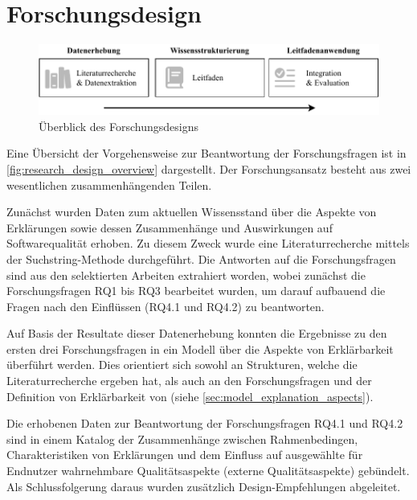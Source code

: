 \section{Forschungsdesign}
\begin{figure}[htb!]
    \begin{center}
        \includegraphics[width=\textwidth]{contents/03_research_design/res/research_design_overview.pdf}
    \end{center}
    \caption{Überblick des Forschungsdesigns}
    \label{fig:research_design_overview}
\end{figure}

Eine Übersicht der Vorgehensweise zur Beantwortung der Forschungsfragen ist in \autoref{fig:research_design_overview} dargestellt. Der Forschungsansatz besteht aus zwei wesentlichen zusammenhängenden Teilen.

Zunächst wurden Daten zum aktuellen Wissensstand über die Aspekte von Erklärungen sowie dessen Zusammenhänge und Auswirkungen auf Softwarequalität erhoben. Zu diesem Zweck wurde eine Literaturrecherche mittels der Suchstring-Methode \cite{kitchenham2004procedures} durchgeführt. Die Antworten auf die Forschungsfragen sind aus den selektierten Arbeiten extrahiert worden, wobei zunächst die Forschungsfragen RQ1 bis RQ3 bearbeitet wurden, um darauf aufbauend die Fragen nach den Einflüssen (RQ4.1 und RQ4.2) zu beantworten.

Auf Basis der Resultate dieser Datenerhebung konnten die Ergebnisse zu den ersten drei Forschungsfragen in ein Modell über die Aspekte von Erklärbarkeit überführt werden. Dies orientiert sich sowohl an Strukturen, welche die Literaturrecherche ergeben hat, als auch an den Forschungsfragen und der Definition von Erklärbarkeit von \citeauthor{chazette_knowledge_nodate} \cite{chazette_knowledge_nodate} (siehe \autoref{sec:model_explanation_aspects}).

Die erhobenen Daten zur Beantwortung der Forschungsfragen RQ4.1 und RQ4.2 sind in einem Katalog der Zusammenhänge zwischen Rahmenbedingen, Charakteristiken von Erklärungen und dem Einfluss auf ausgewählte für Endnutzer wahrnehmbare  Qualitätsaspekte (externe Qualitätsaspekte) gebündelt. Als Schlussfolgerung daraus wurden zusätzlich Design-Empfehlungen abgeleitet.

